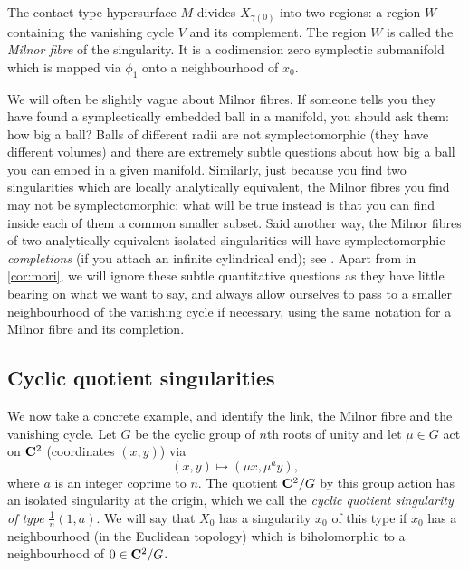 \documentclass{article}
\begin{document}
\begin{Definition}\label{dfn:milnorfibre}
The contact-type hypersurface \(M\) divides \(X_{\gamma(0)}\) into
two regions: a region \(W\) containing the vanishing cycle \(V\) and
its complement. The region \(W\) is called the {\em Milnor fibre} of
the singularity. It is a codimension zero symplectic submanifold
which is mapped via \(\phi_1\) onto a neighbourhood of \(x_0\).


\end{Definition}
\begin{Remark}
We will often be slightly vague about Milnor fibres. If someone
tells you they have found a symplectically embedded ball in a
manifold, you should ask them: how big a ball? Balls of different
radii are not symplectomorphic (they have different volumes) and
there are extremely subtle questions about how big a ball you can
embed in a given manifold. Similarly, just because you find two
singularities which are locally analytically equivalent, the Milnor
fibres you find may not be symplectomorphic: what will be true
instead is that you can find inside each of them a common smaller
subset. Said another way, the Milnor fibres of two analytically
equivalent isolated singularities will have symplectomorphic {\em
completions} (if you attach an infinite cylindrical end); see
{\cite[Proposition11.22]{CieliebakEliashberg}}. Apart from in
\cref{cor:mori}, we will ignore these subtle quantitative questions
as they have little bearing on what we want to say, and always allow
ourselves to pass to a smaller neighbourhood of the vanishing cycle
if necessary, using the same notation for a Milnor fibre and its
completion.


\end{Remark}
\subsection{Cyclic quotient singularities}


We now take a concrete example, and identify the link, the Milnor
fibre and the vanishing cycle. Let \(G\) be the cyclic group of
\(n\)th roots of unity and let \(\mu\in G\) act on \(\mathbf{C}^2\)
(coordinates \((x,y)\)) via \[(x,y)\mapsto (\mu x,\mu^a y),\] where
\(a\) is an integer coprime to \(n\). The quotient \(\mathbf{C}^2/G\) by this
group action has an isolated singularity at the origin, which we call
the {\em cyclic quotient singularity of type} \(\frac{1}{n}(1,a)\). We
will say that \(X_0\) has a singularity \(x_0\) of this type if
\(x_0\) has a neighbourhood (in the Euclidean topology) which is
biholomorphic to a neighbourhood of \(0\in\mathbf{C}^2/G\).
\end{document}
